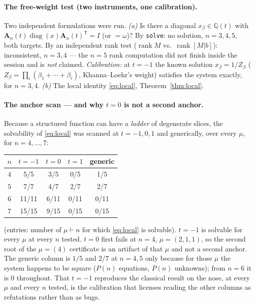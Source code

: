 \documentclass[11pt]{article}
\theoremstyle{definition}
\theoremstyle{remark}
\newcommand{\Q}{\mathbb{Q}}
\newcommand{\Amat}{\mathbf{A}}
\begin{document}
\paragraph{The free-weight test (two instruments, one calibration).}
Two independent formulations were run.  \emph{(a)} Is there a diagonal $x_\beta\in\Q(t)$ with
$\Amat_n(t)\operatorname{diag}(x)\Amat_n(t)^{\mathsf T}=I$ (or $=\omega$)?  By \texttt{solve}:
no solution, $n=3,4,5$, both targets.  By an independent rank test
($\operatorname{rank}M$ vs.\ $\operatorname{rank}[M|b]$): inconsistent, $n=3,4$ --- the
$n=5$ rank computation did not finish inside the session and is \emph{not} claimed.
\emph{Calibration:} at $t=-1$ the known solution $x_\beta=1/Z_\beta$
($Z_\beta=\prod_i(\beta_1+\cdots+\beta_i)$, Khanna--Loehr's weight) satisfies the system
exactly, for $n=3,4$.  \emph{(b)} The local identity \eqref{eq:local}, Theorem~\ref{thm:local}.

\paragraph{The anchor scan --- and why $t=0$ is not a second anchor.}
Because a structured function can have a \emph{ladder} of degenerate slices, the solvability of
\eqref{eq:local} was scanned at $t=-1,0,1$ and generically, over every $\mu$, for $n=4,\dots,7$:

\begin{center}
\begin{tabular}{c|cccc}
 $n$ & $t=-1$ & $t=0$ & $t=1$ & generic\\\hline
 $4$ & 5/5 & 3/5 & 0/5 & 1/5\\
 $5$ & 7/7 & 4/7 & 2/7 & 2/7\\
 $6$ & 11/11 & 6/11 & 0/11 & 0/11\\
 $7$ & 15/15 & 9/15 & 0/15 & 0/15
\end{tabular}
\end{center}

\noindent (entries: number of $\mu\vdash n$ for which \eqref{eq:local} is solvable).  $t=-1$
is solvable for every $\mu$ at every $n$ tested.  $t=0$ first fails at $n=4$, $\mu=(2,1,1)$,
so the second root of the $\mu=(4)$ certificate is an artifact of that $\mu$ and not a second
anchor.  The generic column is $1/5$ and $2/7$ at $n=4,5$ only because for those $\mu$ the
system happens to be square ($P(n)$ equations, $P(n)$ unknowns); from $n=6$ it is $0$
throughout.  That $t=-1$ reproduces the classical result on the nose, at every $\mu$ and every
$n$ tested, is the calibration that licenses reading the other columns as refutations rather
than as bugs.
\end{document}
